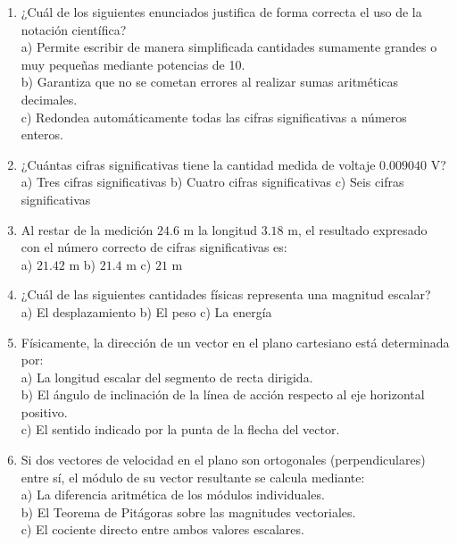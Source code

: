 \documentclass[10pt]{article}
\begin{document}
\begin{enumerate}[leftmargin=*]
    \item ¿Cuál de los siguientes enunciados justifica de forma correcta el uso de la notación científica? \\
    a) Permite escribir de manera simplificada cantidades sumamente grandes o muy pequeñas mediante potencias de 10. \\
    b) Garantiza que no se cometan errores al realizar sumas aritméticas decimales. \\
    c) Redondea automáticamente todas las cifras significativas a números enteros.

    \item ¿Cuántas cifras significativas tiene la cantidad medida de voltaje $0.009040\text{ V}$? \\
    a) Tres cifras significativas \hfill b) Cuatro cifras significativas \hfill c) Seis cifras significativas \hfill \mbox{}

    \item Al restar de la medición $24.6\text{ m}$ la longitud $3.18\text{ m}$, el resultado expresado con el número correcto de cifras significativas es: \\
    a) $21.42\text{ m}$ \hfill b) $21.4\text{ m}$ \hfill c) $21\text{ m}$ \hfill \mbox{}

    \item ¿Cuál de las siguientes cantidades físicas representa una magnitud escalar? \\
    a) El desplazamiento \hfill b) El peso \hfill c) La energía \hfill \mbox{}

    \item Físicamente, la dirección de un vector en el plano cartesiano está determinada por: \\
    a) La longitud escalar del segmento de recta dirigida. \\
    b) El ángulo de inclinación de la línea de acción respecto al eje horizontal positivo. \\
    c) El sentido indicado por la punta de la flecha del vector.

    \item Si dos vectores de velocidad en el plano son ortogonales (perpendiculares) entre sí, el módulo de su vector resultante se calcula mediante: \\
    a) La diferencia aritmética de los módulos individuales. \\
    b) El Teorema de Pitágoras sobre las magnitudes vectoriales. \\
    c) El cociente directo entre ambos valores escalares.


\end{enumerate}
\end{document}
